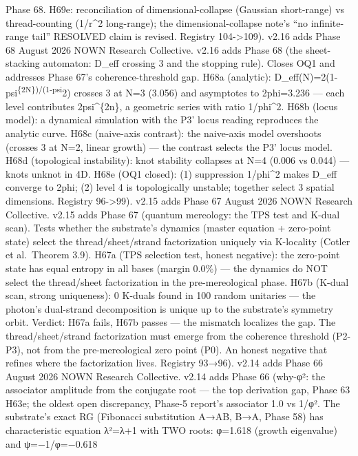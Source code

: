 \documentclass[
]{article}
\begin{document}
{Phase 68. H69e: reconciliation of dimensional-collapse (Gaussian
short-range) vs thread-counting (1/r\^{}2 long-range); the
dimensional-collapse note's ``no infinite-range tail'' RESOLVED claim is
revised. Registry 104-\textgreater109). v2.16 adds Phase 68 \textbar{}
August 2026 \textbar{} NOWN Research Collective. v2.16 adds Phase 68
(the sheet-stacking automaton: D\_eff crossing 3 and the stopping rule).
Closes OQ1 and addresses Phase 67's coherence-threshold gap. H68a
(analytic): D\_eff(N)=2(1-psi\textsuperscript{\{2N\})/(1-psi}2) crosses
3 at N=3 (3.056) and asymptotes to 2phi=3.236 --- each level contributes
2psi\^{}\{2n\}, a geometric series with ratio 1/phi\^{}2. H68b (locus
model): a dynamical simulation with the P3' locus reading reproduces the
analytic curve. H68c (naive-axis contrast): the naive-axis model
overshoots (crosses 3 at N=2, linear growth) --- the contrast selects
the P3' locus model. H68d (topological instability): knot stability
collapses at N=4 (0.006 vs 0.044) --- knots unknot in 4D. H68e (OQ1
closed): (1) suppression 1/phi\^{}2 makes D\_eff converge to 2phi; (2)
level 4 is topologically unstable; together select 3 spatial dimensions.
Registry 96-\textgreater99). v2.15 adds Phase 67 \textbar{} August 2026
\textbar{} NOWN Research Collective. v2.15 adds Phase 67 (quantum
mereology: the TPS test and K-dual scan). Tests whether the substrate's
dynamics (master equation + zero-point state) select the
thread/sheet/strand factorization uniquely via K-locality (Cotler et
al.~Theorem 3.9). H67a (TPS selection test, honest negative): the
zero-point state has equal entropy in all bases (margin 0.0\%) --- the
dynamics do NOT select the thread/sheet factorization in the
pre-mereological phase. H67b (K-dual scan, strong uniqueness): 0 K-duals
found in 100 random unitaries --- the photon's dual-strand decomposition
is unique up to the substrate's symmetry orbit. Verdict: H67a fails,
H67b passes --- the mismatch localizes the gap. The thread/sheet/strand
factorization must emerge from the coherence threshold (P2-P3), not from
the pre-mereological zero point (P0). An honest negative that refines
where the factorization lives. Registry 93→96). v2.14 adds Phase 66
\textbar{} August 2026 \textbar{} NOWN Research Collective. v2.14 adds
Phase 66 (why-φ²: the associator amplitude from the conjugate root ---
the top derivation gap, Phase 63 H63e; the oldest open discrepancy,
Phase-5 report's associator 1.0 vs 1/φ². The substrate's exact RG
(Fibonacci substitution A→AB, B→A, Phase 58) has characteristic equation
λ²=λ+1 with TWO roots: φ=1.618 (growth eigenvalue) and ψ=−1/φ=−0.618
}
\end{document}
